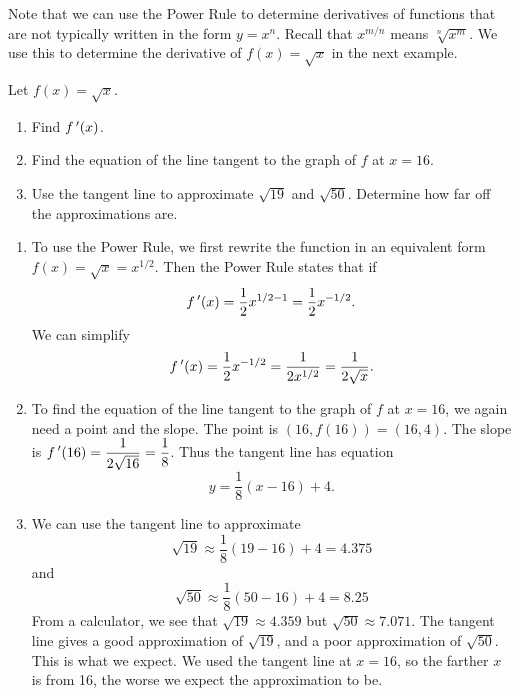 Note that we can use the Power Rule to determine derivatives of functions that are not typically written in the form $y=x^n$.  Recall that $x^{m/n}$ means $\sqrt[n]{x^m}$.  We use this to determine the derivative of $f(x)=\sqrt{x}$ in the next example.\\

{Let $f(x)=\sqrt{x}$. 

		\begin{enumerate}
		\item		Find $f\,'(x)$.
		\item		Find the equation of the line tangent to the graph of $f$ at $x=16$. 
		\item		Use the tangent line to approximate $\sqrt{19}$ and $\sqrt{50}$.  Determine how far off the approximations are.
		\end{enumerate}
}
{	\begin{enumerate}
\enlargethispage{\baselineskip}
		\item		To use the Power Rule, we first rewrite the function in an equivalent form $f(x)=\sqrt{x}=x^{1/2}$.  Then the Power Rule states that if $$ f\,'(x) = \frac{1}{2}x^{1/2-1}=\frac{1}{2}x^{-1/2}.$$  We can simplify $$f\,'(x)= \frac{1}{2}x^{-1/2}=\frac{1}{2x^{1/2}}=\frac{1}{2\sqrt{x}}.$$

		\item		To find the equation of the line tangent to the graph of $f$ at $x=16$, we again need a point and the slope. The point is $(16,f(16))=(16,4)$. The slope is $\displaystyle f\,'(16)= \frac{1}{2\sqrt{16}}=\frac{1}{8}$.
Thus the tangent line has equation $$y = \frac{1}{8}(x-16)+ 4.$$
		
		\item		We can use the tangent line to approximate $$\sqrt{19}\approx \frac{1}{8}(19-16)+4 = 4.375$$ and $$\sqrt{50}\approx \frac{1}{8}(50-16)+4 = 8.25$$  From a calculator, we see that $\sqrt{19}\approx 4.359$ but $\sqrt{50}\approx 7.071$.  The tangent line gives a good approximation of $\sqrt{19}$, and a poor approximation of $\sqrt{50}$.  This is what we expect.  We used the tangent line at $x=16$, so the farther $x$ is from 16, the worse we expect the approximation to be.
		\end{enumerate}
\baselineskip
}\\


